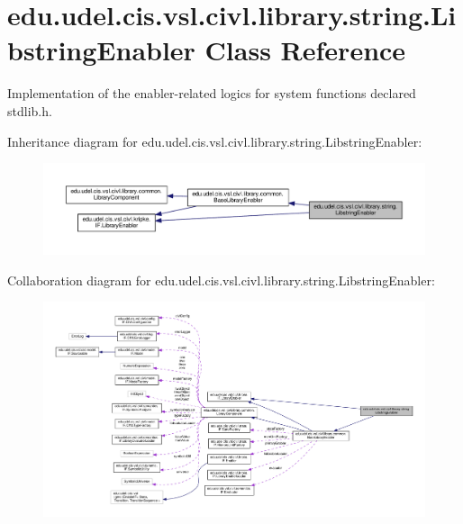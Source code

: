 \hypertarget{classedu_1_1udel_1_1cis_1_1vsl_1_1civl_1_1library_1_1string_1_1LibstringEnabler}{}\section{edu.\+udel.\+cis.\+vsl.\+civl.\+library.\+string.\+Libstring\+Enabler Class Reference}
\label{classedu_1_1udel_1_1cis_1_1vsl_1_1civl_1_1library_1_1string_1_1LibstringEnabler}


Implementation of the enabler-\/related logics for system functions declared stdlib.\+h.  




Inheritance diagram for edu.\+udel.\+cis.\+vsl.\+civl.\+library.\+string.\+Libstring\+Enabler\+:
\nopagebreak
\begin{figure}[H]
\begin{center}
\leavevmode
\includegraphics[width=350pt]{classedu_1_1udel_1_1cis_1_1vsl_1_1civl_1_1library_1_1string_1_1LibstringEnabler__inherit__graph}
\end{center}
\end{figure}


Collaboration diagram for edu.\+udel.\+cis.\+vsl.\+civl.\+library.\+string.\+Libstring\+Enabler\+:
\nopagebreak
\begin{figure}[H]
\begin{center}
\leavevmode
\includegraphics[width=350pt]{classedu_1_1udel_1_1cis_1_1vsl_1_1civl_1_1library_1_1string_1_1LibstringEnabler__coll__graph}
\end{center}
\end{figure}
